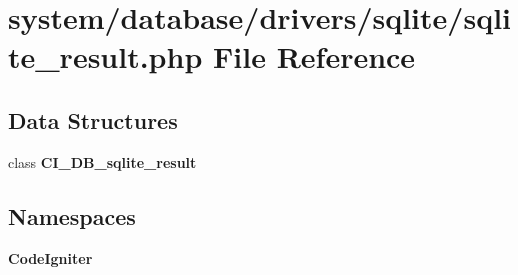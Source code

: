 \section{system/database/drivers/sqlite/sqlite\-\_\-result.php File Reference}
\label{sqlite__result_8php}
\subsection*{Data Structures}
\begin{DoxyCompactItemize}
\item 
class {\bf C\-I\-\_\-\-D\-B\-\_\-sqlite\-\_\-result}
\end{DoxyCompactItemize}
\subsection*{Namespaces}
\begin{DoxyCompactItemize}
\item 
{\bf Code\-Igniter}
\end{DoxyCompactItemize}
